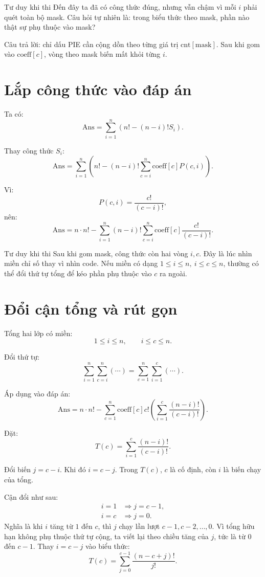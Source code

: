 \documentclass[12pt]{article}
\newcommand{\cnt}{\mathrm{cnt}}
\newcommand{\coef}{\mathrm{coeff}}
\newcommand{\msk}{\mathrm{mask}}
\begin{document}
\begin{thinkbox}{Tư duy khi thi}
Đến đây ta đã có công thức đúng, nhưng vẫn chậm vì mỗi \(i\) phải quét toàn bộ mask. Câu hỏi tự nhiên là: trong biểu thức theo mask, phần nào thật sự phụ thuộc vào mask?

Câu trả lời: chỉ dấu PIE cần cộng dồn theo từng giá trị \(\cnt[\msk]\). Sau khi gom vào \(\coef[c]\), vòng theo mask biến mất khỏi từng \(i\).
\end{thinkbox}

\section{Lắp công thức vào đáp án}

Ta có:
\[
\mathrm{Ans}
=
\sum_{i=1}^{n}
\left(
n!-(n-i)!S_i
\right).
\]

Thay công thức \(S_i\):
\[
\mathrm{Ans}
=
\sum_{i=1}^{n}
\left(
n!-(n-i)!
\sum_{c=i}^{n}\coef[c]P(c,i)
\right).
\]

Vì:
\[
P(c,i)=\frac{c!}{(c-i)!},
\]
nên:
\[
\mathrm{Ans}
=
n\cdot n!
-
\sum_{i=1}^{n}
(n-i)!
\sum_{c=i}^{n}
\coef[c]\frac{c!}{(c-i)!}.
\]

\begin{thinkbox}{Tư duy khi thi}
Sau khi gom mask, công thức còn hai vòng \(i,c\). Đây là lúc nhìn miền chỉ số thay vì nhìn code. Nếu miền có dạng \(1\le i\le n,\ i\le c\le n\), thường có thể đổi thứ tự tổng để kéo phần phụ thuộc vào \(c\) ra ngoài.
\end{thinkbox}

\section{Đổi cận tổng và rút gọn}

Tổng hai lớp có miền:
\[
1\le i\le n,\qquad i\le c\le n.
\]

Đổi thứ tự:
\[
\sum_{i=1}^{n}
\sum_{c=i}^{n}
(\cdots)
=
\sum_{c=1}^{n}
\sum_{i=1}^{c}
(\cdots).
\]

Áp dụng vào đáp án:
\[
\mathrm{Ans}
=
n\cdot n!
-
\sum_{c=1}^{n}
\coef[c]c!
\left(
\sum_{i=1}^{c}
\frac{(n-i)!}{(c-i)!}
\right).
\]

Đặt:
\[
T(c)=
\sum_{i=1}^{c}
\frac{(n-i)!}{(c-i)!}.
\]

Đổi biến \(j=c-i\). Khi đó \(i=c-j\). Trong \(T(c)\),
\(c\) là cố định, còn \(i\) là biến chạy của tổng.

Cận đổi như sau:
\[
\begin{aligned}
i=1 &\Rightarrow j=c-1,\\
i=c &\Rightarrow j=0.
\end{aligned}
\]
Nghĩa là khi \(i\) tăng từ \(1\) đến \(c\), thì \(j\) chạy lần lượt
\(c-1,c-2,\ldots,0\). Vì tổng hữu hạn không phụ thuộc thứ tự cộng,
ta viết lại theo chiều tăng của \(j\), tức là từ \(0\) đến \(c-1\).
Thay \(i=c-j\) vào biểu thức:
\[
T(c)=
\sum_{j=0}^{c-1}
\frac{(n-c+j)!}{j!}.
\]
\end{document}
